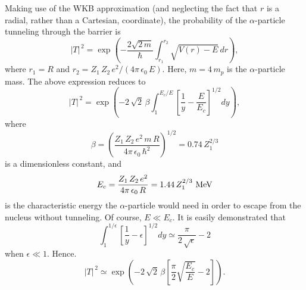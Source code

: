 Making use of the WKB approximation (and neglecting the fact
that $r$ is a radial, rather than a Cartesian, coordinate), the probability
of the $\alpha$-particle tunneling through the barrier is
\begin{equation}
|T|^{\,2} = \exp\left(-\frac{2\sqrt{2\,m}}{\hbar}\int_{r_1}^{r_2}
\sqrt{V(r)-E}\,dr\right),
\end{equation}
where $r_1=R$ and $r_2 = Z_1\,Z_2\,e^2/(4\pi\,\epsilon_0\,E)$. Here,
$m=4\,m_p$ is the $\alpha$-particle mass. The above expression 
reduces to
\begin{equation}
|T|^{\,2} = \exp\left(-2\,\sqrt{2}\,\beta \int_{1}^{E_c/E}\left[\frac{1}{y}-\frac{E}{E_c}\right]^{1/2} dy\right),
\end{equation}
where 
\begin{equation}
\beta = \left(\frac{Z_1\,Z_2\,e^2\,m\,R}{4\pi\,\epsilon_0\,\hbar^2}\right)^{1/2} = 0.74\,Z_1^{2/3}
\end{equation}
is a dimensionless constant, and
\begin{equation}
E_c = \frac{Z_1\,Z_2\,e^2}{4\pi\,\epsilon_0\,R} = 1.44\,Z_1^{2/3}\,\,{\rm MeV}
\end{equation}
is the characteristic energy the $\alpha$-particle would need in order to escape
from the nucleus without tunneling. Of course, $E\ll E_c$. 
It is easily demonstrated that
\begin{equation}
\int_1^{1/\epsilon}\left[\frac{1}{y} - \epsilon\right]^{1/2} dy \simeq
\frac{\pi}{2\,\sqrt{\epsilon}}-2
\end{equation}
when $\epsilon\ll 1$. 
Hence.
\begin{equation}
|T|^{\,2} \simeq \exp\left(-2\,\sqrt{2}\,\beta\left[\frac{\pi}{2}\sqrt{\frac{E_c}{E}}-2\right]\right).
\end{equation}

